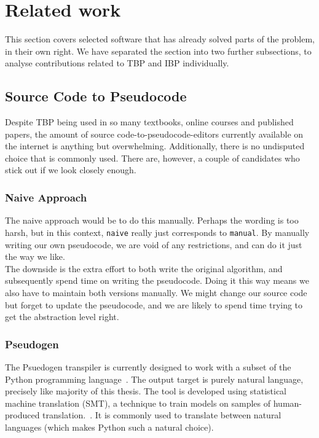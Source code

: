 \section{Related work}

This section covers selected software that has already solved parts of the problem, in their own right. We have separated the section into two further subsections, to analyse contributions related to TBP and IBP individually.

\subsection{Source Code to Pseudocode}

Despite TBP being used in so many textbooks, online courses and published papers, the amount of source code-to-pseudocode-editors currently available on the internet is anything but overwhelming. Additionally, there is no undisputed choice that is commonly used. There are, however, a couple of candidates who stick out if we look closely enough.

\subsubsection{Naive Approach}

The naive approach would be to do this manually. Perhaps the wording is too harsh, but in this context, \texttt{naive} really just corresponds to \texttt{manual}. By manually writing our own pseudocode, we are void of any restrictions, and can do it just the way we like. \\

The downside is the extra effort to both write the original algorithm, and subsequently spend time on writing the pseudocode. Doing it this way means we also have to maintain both versions manually. We might change our source code but forget to update the pseudocode, and we are likely to spend time trying to get the abstraction level right.

\subsubsection{Pseudogen}

The Psuedogen transpiler is currently designed to work with a subset of the Python programming language~\cite{pseudogen}. The output target is purely natural language, precisely like majority of this thesis. The tool is developed using statistical machine translation (SMT), a technique to train models on samples of human-produced translation.~\cite{whatIsSMT}. It is commonly used to translate between natural languages (which makes Python such a natural choice). \\

